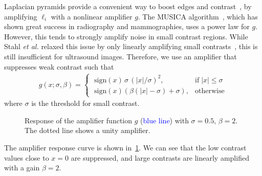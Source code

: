 Laplacian pyramids provide a convenient way to boost edges and contrast~\cite{vuylsteke_multiscale_1994, stahl_noiseresistant_1999, dippel_multiscale_2002}, by amplifying \({\boldsymbol\ell}_{i}\) with a nonlinear amplifier \(g\).
The MUSICA algorithm~\cite{vuylsteke_multiscale_1994}, which has shown great success in radiography and mammographies, uses a power law for \(g\).
However, this tends to strongly amplify noise in small contrast regions.
While Stahl \textit{et al.} relaxed this issue by only linearly amplifying small contrasts~\cite{stahl_noiseresistant_1999}, this is still insufficient for ultrasound images.
Therefore, we use an amplifier that suppresses weak contrast such that
\begin{align}
  g\left(x; \sigma, \beta \right) =
  \begin{cases}
    \;\mathrm{sign}\left( x \right) \, \sigma \, {\left( |x|/\sigma \right)}^2, & \text{if}\; |x| \leq \sigma \\
    \;\mathrm{sign}\left( x \right) \left( \beta \left(|x| - \sigma \right) + \sigma \right), & \text{otherwise}
  \end{cases}
\end{align}
where \(\sigma\) is the threshold for small contrast.
%
\begin{figure}[t]
  \centering
  \caption{Response of the amplifier function \(g\) (\textcolor{blue}{blue line}) with \(\sigma=0.5\), \(\beta=2\).
  The dotted line shows a unity amplifier.}\label{fig:amp}
\end{figure}
%
The amplifier response curve is shown in~\cref{fig:amp}.
We can see that the low contrast values close to \(x=0\) are suppressed, and large contrasts are linearly amplified with a gain \(\beta=2\).


